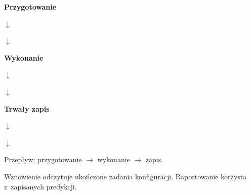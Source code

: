 \begin{minipage}[t]{0.31\linewidth}\centering\textbf{Przygotowanie}\par\medskip
{}\par\smallskip$\downarrow$\par\smallskip{}\par\smallskip$\downarrow$\par\smallskip{}\end{minipage}
\hfill
\begin{minipage}[t]{0.31\linewidth}\centering\textbf{Wykonanie}\par\medskip
{}\par\smallskip$\downarrow$\par\smallskip{}\par\smallskip$\downarrow$\par\smallskip{}\end{minipage}
\hfill
\begin{minipage}[t]{0.31\linewidth}\centering\textbf{Trwały zapis}\par\medskip
{}\par\smallskip$\downarrow$\par\smallskip{}\par\smallskip$\downarrow$\par\smallskip{}\end{minipage}\par\medskip Przepływ: przygotowanie $\longrightarrow$ wykonanie $\longrightarrow$ zapis.\par Wznowienie odczytuje ukończone zadania konfiguracji. Raportowanie korzysta z~zapisanych predykcji.
